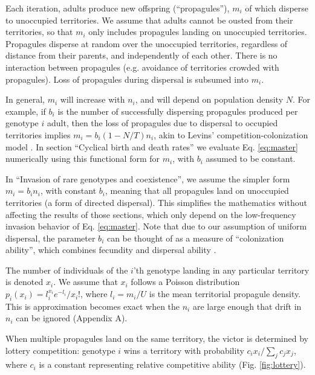 \documentclass[11pt]{article}
\begin{document}
Each iteration, adults produce new offspring (``propagules''), $m_i$ of which disperse to unoccupied territories. We assume that adults cannot be ousted from their territories, so that $m_i$ only includes propagules landing on unoccupied territories. Propagules disperse at random over the unoccupied territories, regardless of distance from their parents, and independently of each other. There is no interaction between propagules (e.g. avoidance of territories crowded with propagules). Loss of propagules during dispersal is subsumed into $m_i$. 

In general, $m_i$ will increase with $n_i$, and will depend on population density $N$. For example, if $b_i$ is the number of successfully dispersing propagules produced per genotype $i$ adult, then the loss of propagules due to dispersal to occupied territories implies $m_i=b_i(1-N/T)n_i$, akin to Levins' competition-colonization model \citep{levins_71,tilman_94}. In section ``Cyclical birth and death rates'' we evaluate Eq. \eqref{eq:master} numerically using this functional form for $m_i$, with $b_i$ assumed to be constant. 

In ``Invasion of rare genotypes and coexistence'', we assume the simpler form $m_i=b_i n_i$, with constant $b_i$, meaning that all propagules land on unoccupied territories (a form of directed dispersal). This simplifies the mathematics without affecting the results of those sections, which only depend on the low-frequency invasion behavior of Eq. \eqref{eq:master}. Note that due to our assumption of uniform dispersal, the parameter $b_i$ can be thought of as a measure of ``colonization ability'', which combines fecundity and dispersal ability \citep{levins_71,tilman_94,bolker_99}. 

The number of individuals of the $i$'th genotype landing in any particular territory is denoted $x_i$. We assume that $x_i$ follows a Poisson distribution $p_i(x_i)=l_i^{x_i} e^{-l_i}/x_i!$, where $l_i=m_i/U$ is the mean territorial propagule density. This is approximation becomes exact when the $n_i$ are large enough that drift in $n_i$ can be ignored (Appendix A).

When multiple propagules land on the same territory, the victor is determined by lottery competition: genotype $i$ wins a territory with probability $c_i x_i/\sum_j c_j x_j$, where $c_i$ is a constant representing relative competitive ability (Fig. \ref{fig:lottery}). 
\end{document}
